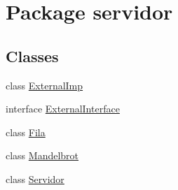 \hypertarget{namespaceservidor}{}\section{Package servidor}
\label{namespaceservidor}
\subsection*{Classes}
\begin{DoxyCompactItemize}
\item 
class \hyperlink{classservidor_1_1ExternalImp}{External\+Imp}
\item 
interface \hyperlink{interfaceservidor_1_1ExternalInterface}{External\+Interface}
\item 
class \hyperlink{classservidor_1_1Fila}{Fila}
\item 
class \hyperlink{classservidor_1_1Mandelbrot}{Mandelbrot}
\item 
class \hyperlink{classservidor_1_1Servidor}{Servidor}
\end{DoxyCompactItemize}
